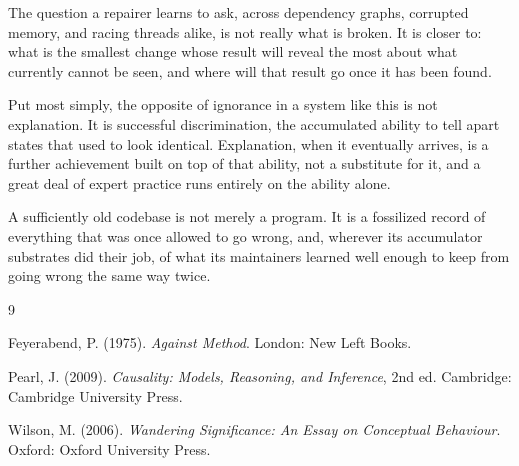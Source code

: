 \documentclass[11pt]{article}
\begin{document}
The question a repairer learns to ask, across dependency graphs, corrupted memory, and racing threads alike, is not really what is broken. It is closer to: what is the smallest change whose result will reveal the most about what currently cannot be seen, and where will that result go once it has been found.

Put most simply, the opposite of ignorance in a system like this is not explanation. It is successful discrimination, the accumulated ability to tell apart states that used to look identical. Explanation, when it eventually arrives, is a further achievement built on top of that ability, not a substitute for it, and a great deal of expert practice runs entirely on the ability alone.

A sufficiently old codebase is not merely a program. It is a fossilized record of everything that was once allowed to go wrong, and, wherever its accumulator substrates did their job, of what its maintainers learned well enough to keep from going wrong the same way twice.

\begin{thebibliography}{9}

 Feyerabend, P. (1975). \textit{Against Method}. London: New Left Books.

 Pearl, J. (2009). \textit{Causality: Models, Reasoning, and Inference}, 2nd ed. Cambridge: Cambridge University Press.

 Wilson, M. (2006). \textit{Wandering Significance: An Essay on Conceptual Behaviour}. Oxford: Oxford University Press.

\end{thebibliography}
\end{document}

